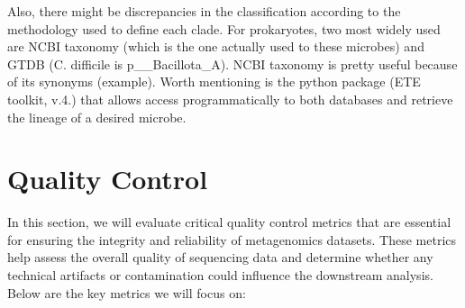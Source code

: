 Also, there might be discrepancies in the classification according to the methodology used to define each clade. 
For prokaryotes, two most widely used are NCBI taxonomy (which is the one actually used to these microbes) and 
GTDB (C. difficile is p\_\_Bacillota\_A). NCBI taxonomy is pretty useful because of its synonyms (example). Worth mentioning 
is the python package (ETE toolkit, v.4.) that allows access programmatically to both databases and retrieve the 
lineage of a desired microbe.



\section{Quality Control}
In this section, we will evaluate critical quality control metrics that are essential for ensuring the integrity and reliability 
of metagenomics datasets. These metrics help assess the overall quality of sequencing data and determine whether any 
technical artifacts or contamination could influence the downstream analysis. Below are the key metrics we will focus on:
